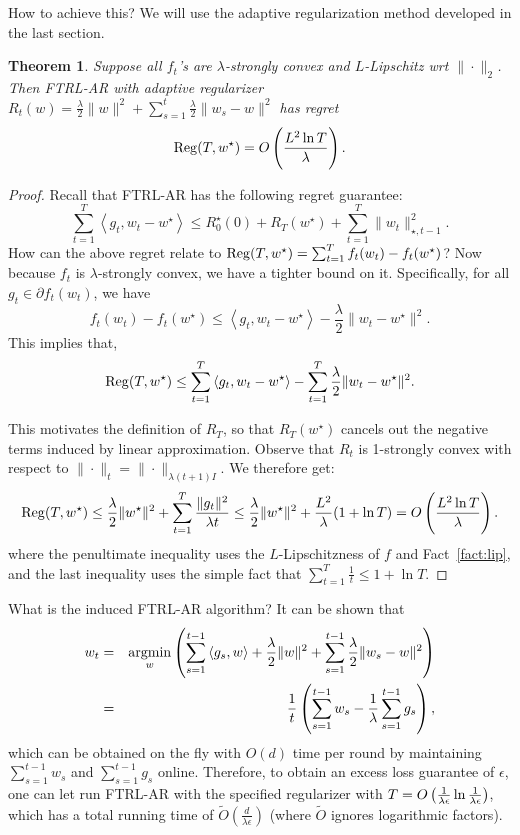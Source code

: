 \documentclass{article}
\newtheorem{theorem}{Theorem}
\DeclareMathOperator*{\Reg}{{\rm Reg}}
\DeclareMathOperator*{\argmin}{{\rm argmin}}
\newcommand{\inner}[2]{\left\langle #1,#2 \right\rangle}
\begin{document}
How to achieve this? We will use the adaptive regularization method developed in the last section.
\begin{theorem}
Suppose all $f_t$'s are $\lambda$-strongly convex and $L$-Lipschitz wrt $\| \cdot \|_2$. Then FTRL-AR with adaptive regularizer  $R_t(w) = \frac\lambda 2\| w \|^2 + \sum_{s=1}^t \frac\lambda 2\| w_s - w \|^2$ has regret
\[ \Reg(T, w^\star) = O\del{\frac{L^2 \ln T}{\lambda}}. \]
\label{thm:log-ftrl-ar}
\end{theorem}
\begin{proof}
Recall that FTRL-AR has the following regret guarantee:
\[ \sum_{t=1}^T \inner{g_t}{w_t - w^\star} \leq R_0^\star(0) + R_T(w^\star) + \sum_{t=1}^T \| w_t \|_{\star, t-1}^2. \]
How can the above regret relate to $\Reg(T, w^\star) = \sum_{t=1}^T f_t(w_t) - f_t(w^\star)$? Now because $f_t$ is $\lambda$-strongly convex, we have a tighter bound on it. Specifically, for all $g_t \in \partial f_t(w_t)$, we have
\[ f_t(w_t) - f_t(w^\star) \leq \inner{g_t}{w_t - w^\star} - \frac\lambda 2\| w_t - w^\star \|^2. \]
This implies that,
\[ \Reg(T, w^\star) \leq \sum_{t=1}^T \inner{g_t}{w_t - w^\star} - \sum_{t=1}^T \frac\lambda 2\| w_t - w^\star \|^2. \]

This motivates the definition of $R_T$, so that $R_T(w^\star)$ cancels out the negative terms induced by linear approximation.
Observe that $R_t$ is 1-strongly convex with respect to $\| \cdot \|_t = \| \cdot \|_{\lambda(t+1) I}$.
We therefore get:
\[ \Reg(T, w^\star) \leq \frac{\lambda}{2}\|w^\star\|^2 + \sum_{t=1}^T \frac{\| g_t \|^2}{\lambda t} \leq \frac{\lambda}{2}\|w^\star\|^2 + \frac{L^2}{\lambda}(1 + \ln T) = O\del{\frac{L^2 \ln T}{\lambda}}. \]
where the penultimate inequality uses the $L$-Lipschitzness of $f$ and Fact~\ref{fact:lip}, and the last inequality uses the simple fact that $\sum_{t=1}^T \frac1t \leq 1 + \ln T$.
\end{proof}

What is the induced FTRL-AR algorithm? It can be shown that
\begin{eqnarray*}
  w_t &=& \argmin_w \del{ \sum_{s=1}^{t-1} \inner{g_s}{w} + \frac\lambda 2\| w \|^2 + \sum_{s=1}^{t-1} \frac\lambda 2\| w_s - w \|^2} \\
  &=& \frac{1}{t} \del{\sum_{s=1}^{t-1} w_s - \frac1\lambda \sum_{s=1}^{t-1} g_s},
\end{eqnarray*}
which can be obtained on the fly with $O(d)$ time per round
by maintaining $\sum_{s=1}^{t-1} w_s$ and $\sum_{s=1}^{t-1} g_s$ online. Therefore, to obtain an excess loss guarantee of $\epsilon$, one can let run FTRL-AR with the specified regularizer with $T = O\del{ \frac{1}{\lambda\epsilon}\ln\frac{1}{\lambda\epsilon}}$, which has a total running time of $\tilde{O}(\frac{d}{\lambda \epsilon})$
(where $\tilde{O}$ ignores logarithmic factors).
\end{document}
